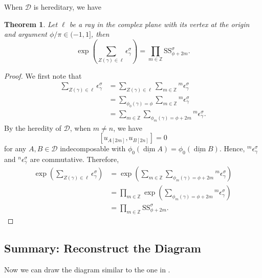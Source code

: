 \documentclass[a4paper,12pt]{amsart}
\newtheorem{theorem}{Theorem}[section]
\newcommand{\udv}{\underline{\dim}}
\newcommand{\Ss}{\mathrm{SS}}
\begin{document}
When $\mathcal{D}$ is hereditary, we have
\begin{theorem}\label{Left part}
Let $\ell$ be a ray in the complex plane with its vertex at the origin and argument $\phi/\pi\in(-1,1]$, then
    \[\exp\left(\sum_{Z(\gamma)\in\ell}\epsilon^\sigma_\gamma\right)=\prod_{m\in\mathbb{Z}}\Ss^\sigma_{\phi+2m}.\]
\end{theorem}
\begin{proof}
    We first note that
    \begin{align*}
        \sum_{Z(\gamma)\in\ell}\epsilon^\sigma_\gamma&=\sum_{Z(\gamma)\in\ell}\sum_{m\in\mathbb{Z}}{^m}\epsilon^\sigma_\gamma\\
        &=\sum_{\phi_0(\gamma)=\phi}\sum_{m\in\mathbb{Z}}{^m}\epsilon^\sigma_\gamma\\
        &=\sum_{m\in\mathbb{Z}}\sum_{\phi_m(\gamma)=\phi+2m}{^m}\epsilon^\sigma_\gamma.
    \end{align*}
    By the heredity of $\mathcal{D}$, when $m\neq n$, we have
    \[[u_{A[2m]},u_{B[2n]}]=0\]
    for any $A,B\in\mathcal{D}$ indecomposable with $\phi_0(\udv A)=\phi_0(\udv B)$. Hence, ${^m}\epsilon^\sigma_\gamma$ and ${^n}\epsilon^\sigma_\gamma$ are commutative. Therefore,
    \begin{align*}
        \exp\left(\sum_{Z(\gamma)\in\ell}\epsilon^\sigma_\gamma\right)&=\exp\left(\sum_{m\in\mathbb{Z}}\sum_{\phi_m(\gamma)=\phi+2m}{^m}\epsilon^\sigma_\gamma\right)\\
        &=\prod_{m\in\mathbb{Z}}\exp\left(\sum_{\phi_m(\gamma)=\phi+2m}{^m}\epsilon^\sigma_\gamma\right)\\
        &=\prod_{m\in\mathbb{Z}}\Ss^\sigma_{\phi+2m}.
    \end{align*}
\end{proof}

\subsection{Summary: Reconstruct the Diagram}
Now we can draw the diagram similar to the one in \cite{BT2012}.
\begin{center}
\end{center}
\end{document}
